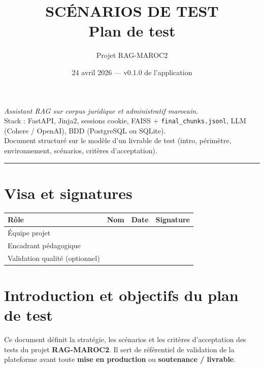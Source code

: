 \documentclass[11pt,a4paper]{article}
\title{%
  \textbf{SCÉNARIOS DE TEST}\\[0.35em]
  \large Plan de test%
}
\author{Projet RAG-MAROC2}
\date{24 avril 2026 — v0.1.0 de l'application}
\begin{document}
\maketitle
\thispagestyle{empty}
\begin{center}
\small
\textit{Assistant RAG sur corpus juridique et administratif marocain.}\\
Stack : FastAPI, Jinja2, sessions cookie, FAISS + \texttt{final\_chunks.jsonl}, LLM (Cohere / OpenAI), BDD (PostgreSQL ou SQLite).\\[0.8em]
Document structuré sur le modèle d'un livrable de test (intro, périmètre, environnement, scénarios, critères d'acceptation).
\end{center}
\vspace{0.5em}
\hrule
\vspace{0.8em}

\tableofcontents
\newpage

\section{Visa et signatures}
\begin{table}[h]
\centering
\small
\begin{tabular}{@{}p{4.2cm}p{3.2cm}p{2.2cm}p{3.2cm}@{}}
\toprule
\textbf{Rôle} & \textbf{Nom} & \textbf{Date} & \textbf{Signature} \\
\midrule
Équipe projet & & & \\
Encadrant pédagogique & & & \\
Validation qualité (optionnel) & & & \\
\bottomrule
\end{tabular}
\end{table}

\section{Introduction et objectifs du plan de test}

Ce document définit la stratégie, les scénarios et les critères d'acceptation des tests du projet \textbf{RAG-MAROC2}. Il sert de référentiel de validation de la plateforme avant toute \textbf{mise en production} ou \textbf{soutenance / livrable}.
\end{document}
